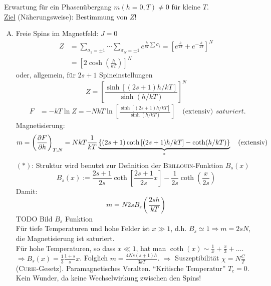 Erwartung für ein Phasenübergang $m(h=0, T) \neq 0$ für kleine $T$. \\
\underline{Ziel} (Näherungsweise): Bestimmung von $Z$!
\begin{enumerate}[A)]
    \item Freie Spins im Magnetfeld: $J = 0$
    \begin{equation}
        \begin{split}
            Z &= \sum_{\sigma_1 = \pm 1} \cdots \sum_{\sigma_N = \pm 1} e^{ \frac{h}{kT} \sum \sigma_i } = \left[ e^{\frac{h}{kT}} + e^{-\frac{h}{kT}} \right]^N \\
            &= \left[2 \cosh \left( \frac{h}{kT} \right) \right]^N
        \end{split}
    \end{equation}
    oder, allgemein, für $2s+1$ Spineinstellungen
    \begin{equation}
        Z = \left[ \frac{\sinh \left[ (2s+1) h / kT \right]}{\sinh (h/kT)} \right]^N
    \end{equation}
    \begin{equation}
        \begin{split}
            F &= - k T \ln Z = - N k T \ln \left[  \frac{\sinh \left[ (2s+1) h / kT \right]}{\sinh (h/kT)} \right] \quad \text{(extensiv)}
        \end{split}saturiert.
    \end{equation}
    Magnetisierung:
    \begin{equation}
        m = \left( \frac{\partial F}{\partial h} \right)_{T, N} = N k T \frac{1}{k T} \underbrace{\left\{ (2s+1) \coth \left[ (2s+1) h/kT \right] - \coth(h/kT)  \right\}}_{*} \quad \text{(extensiv)}
    \end{equation}
    $(*)$: Struktur wird benutzt zur Definition der \textsc{Brillouin}-Funktion $B_s(x)$
    \begin{equation}
        B_s(x) := \frac{2s+1}{2s} \coth \left[ \frac{2s+1}{2s} x \right] - \frac{1}{2s} \coth \left( \frac{x}{2s} \right)
    \end{equation}
    Damit:
    \begin{equation}
        m = N 2 s B_s \left( \frac{2 s h}{k T} \right)
    \end{equation}
    TODO Bild $B_s$ Funktion \\ %
    Für tiefe Temperaturen und hohe Felder ist $x \gg 1$, d.h. $B_s \simeq 1 \Rightarrow m = 2 s N$, die Magnetisierung ist saturiert. \\
    Für hohe Temperaturen, so dass $x \ll 1$, hat man $\coth(x) \sim \frac{1}{x} + \frac{x}{3} + \ldots$.
    $\Rightarrow B_s(x) = \frac{1}{3} \frac{1+s}{s} x$. Folglich $m = \frac{4 N s (s+1) h}{3 k T}$. $\Rightarrow$ Suszeptibilität $\chi = N \frac{C}{T}$ (\textsc{Curie}-Gesetz).
    Paramagnetisches Veralten. "`Kritische Temperatur"' $T_c = 0$. Kein Wunder, da keine Wechselwirkung zwischen den Spins!
    

\end{enumerate}
